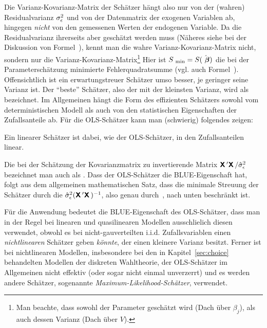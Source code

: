 Die Varianz-Kovarianz-Matrix der Sch\"atzer h\"angt also nur von der
(wahren) Residualvarianz $\sigma_{\epsilon}^2$ und von der Datenmatrix der
exogenen Variablen ab, hingegen \emph{nicht} von den gemessenen Werten
der endogenen Variable. Da die Residualvarianz ihrerseits aber gesch\"atzt
werden muss (N\"aheres siehe bei der Diskussion von
Formel~), kennt man die wahre Varianz-Kovarianz-Matrix nicht, sondern nur
die  Varianz-Kovarianz-Matrix\footnote{Man beachte, dass
  sowohl der Parameter gesch\"atzt 
  wird (Dach \"uber $\beta_j$), als auch dessen Varianz (Dach \"uber
  $V$).}
Hier ist $S_{{\mbox{ {\scriptsize \hspace{-0.0ex}min}}}}=S(\hat{{\mbox{ \boldmath{$\beta$}}}})$ die bei der Parametersch\"atzung 
minimierte Fehlerquadratsumme (vgl. auch Formel~).
Offensichtlich ist ein erwartungstreuer Sch\"atzer umso besser, je
geringer seine Varianz ist. Der ``beste'' Sch\"atzer, also der mit der
kleinsten Varianz, wird als  bezeichnet. Im
Allgemeinen h\"angt die Form des effizienten Sch\"atzers sowohl vom
deterministischen Modell als auch von den statistischen Eigenschaften
der Zufallsanteile ab. F\"ur die OLS-Sch\"atzer kann man (schwierig)
folgendes  zeigen:

Ein linearer Sch\"atzer ist dabei, wie der OLS-Sch\"atzer, in den
Zufallsanteilen linear.

Die bei der Sch\"atzung der Kovarianzmatrix zu
 invertierende Matrix $\textbf{\textsf{X}}\,'\textbf{\textsf{X}}\,/\hat{\sigma}_{\epsilon}^2$ bezeichnet man auch als 
. Dass der OLS-Sch\"atzer die
BLUE-Eigenschaft hat, folgt aus dem allgemeinen mathematischen Satz,
dass die minimale Streuung der Sch\"atzer durch die
 $\hat{\sigma}_{\epsilon}^2(\textbf{\textsf{X}}\,'\textbf{\textsf{X}}\,)^{-1}$,
also genau durch~, nach
unten beschr\"ankt ist.


F\"ur die Anwendung bedeutet die BLUE-Eigenschaft des OLS-Sch\"atzer,
dass man in der Regel bei 
linearen und quasilinearen Modellen ausschlie\3lich diesen
verwendet, obwohl es bei nicht-gau\3verteilten i.i.d. Zufallsvariablen
einen \emph{nichtlinearen} Sch\"atzer geben \emph{k\"onnte}, der einen
kleinere Varianz besitzt. Ferner  ist bei nichtlinearen Modellen, insbesondere bei
den in Kapitel~\ref{sec:choice} behandelten Modellen der
diskreten Wahltheorie, der OLS-Sch\"atzer im Allgemeinen nicht
effektiv (oder sogar nicht einmal unverzerrt)
und es werden andere Sch\"atzer, sogenannte
\emph{Maximum-Likelihood-Sch\"atzer}, verwendet.

